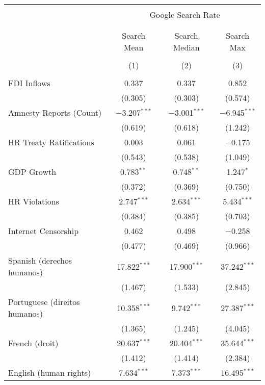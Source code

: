 
\begin{table}[!htbp] \centering 
  \caption{} 
  \label{} 
\begin{tabular}{@{\extracolsep{5pt}}lccc} 
\\[-1.8ex]\hline 
\hline \\[-1.8ex] 
 & \multicolumn{3}{c}{Google Search Rate} \\ 
\cline{2-4} 
\\[-1.8ex] & \multicolumn{3}{c}{ } \\ 
 & Search Mean & Search Median & Search Max \\ 
\\[-1.8ex] & (1) & (2) & (3)\\ 
\hline \\[-1.8ex] 
 FDI Inflows & 0.337 & 0.337 & 0.852 \\ 
  & (0.305) & (0.303) & (0.574) \\ 
  Amnesty Reports (Count) & $-$3.207$^{***}$ & $-$3.001$^{***}$ & $-$6.945$^{***}$ \\ 
  & (0.619) & (0.618) & (1.242) \\ 
  HR Treaty Ratifications & 0.003 & 0.061 & $-$0.175 \\ 
  & (0.543) & (0.538) & (1.049) \\ 
  GDP Growth & 0.783$^{**}$ & 0.748$^{**}$ & 1.247$^{*}$ \\ 
  & (0.372) & (0.369) & (0.750) \\ 
  HR Violations & 2.747$^{***}$ & 2.634$^{***}$ & 5.434$^{***}$ \\ 
  & (0.384) & (0.385) & (0.703) \\ 
  Internet Censorship & 0.462 & 0.498 & $-$0.258 \\ 
  & (0.477) & (0.469) & (0.966) \\ 
  Spanish (derechos humanos) & 17.822$^{***}$ & 17.900$^{***}$ & 37.242$^{***}$ \\ 
  & (1.467) & (1.533) & (2.845) \\ 
  Portuguese (direitos humanos) & 10.358$^{***}$ & 9.742$^{***}$ & 27.387$^{***}$ \\ 
  & (1.365) & (1.245) & (4.045) \\ 
  French (droit) & 20.637$^{***}$ & 20.404$^{***}$ & 35.644$^{***}$ \\ 
  & (1.412) & (1.414) & (2.384) \\ 
  English (human rights) & 7.634$^{***}$ & 7.373$^{***}$ & 16.495$^{***}$ \\ 

\end{tabular}
\end{table}

